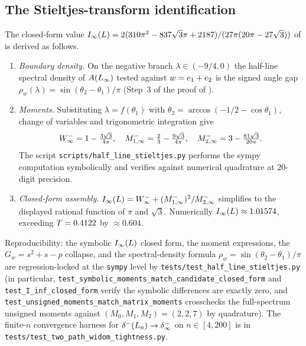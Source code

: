 \subsection{The Stieltjes-transform identification}\label{app:repro:stieltjes}

The closed-form value
$\Iinf{L} = 2(310\pi^{2} - 837\sqrt{3}\pi + 2187)/(27\pi(20\pi - 27\sqrt{3}))$
of  is derived as follows.

\begin{enumerate}
\item \emph{Boundary density.} On the negative branch
$\lambda \in (-9/4, 0)$ the half-line spectral density of $\Adj(L_{\infty})$
tested against $\earw = e_{1} + e_{2}$ is the signed angle gap
$\rho_{w}(\lambda) = \sin(\theta_{2} - \theta_{1})/\pi$ (Step~3 of the
proof of ).

\item \emph{Moments.} Substituting $\lambda = f(\theta_{1})$ with
$\theta_{2} = \arccos(-1/2 - \cos\theta_{1})$, change of variables and
trigonometric integration give
\[
\Wm_{\infty} = 1 - \tfrac{3\sqrt{3}}{4\pi},
\quad
\Monem[1, \infty] = \tfrac{2}{3} - \tfrac{9\sqrt{3}}{4\pi},
\quad
\Mtwom[2, \infty] = 3 - \tfrac{81\sqrt{3}}{20\pi}.
\]
The script \texttt{scripts/half\_line\_stieltjes.py} performs the
sympy computation symbolically and verifies against numerical
quadrature at $20$-digit precision.

\item \emph{Closed-form assembly.}
$\Iinf{L} = \Wm_{\infty} + (\Monem[1, \infty])^{2}/\Mtwom[2, \infty]$
simplifies to the displayed rational function of $\pi$ and $\sqrt{3}$.
Numerically $\Iinf{L} \approx 1.01574$, exceeding $\threshold = 0.4122$
by $\approx 0.604$.
\end{enumerate}
Reproducibility: the symbolic
$\Iinf{L}$ closed form, the moment expressions, the $G_{w} = s^{2} + s
- p$ collapse, and the spectral-density formula
$\rho_{w} = \sin(\theta_{2} - \theta_{1})/\pi$ are regression-locked at
the \texttt{sympy} level by
\texttt{tests/test\_half\_line\_stieltjes.py} (in particular,
\texttt{test\_symbolic\_moments\_match\_candidate\_closed\_form} and
\texttt{test\_I\_inf\_closed\_form} verify the symbolic differences are
exactly zero, and \texttt{test\_unsigned\_moments\_match\_matrix\_moments}
crosschecks the full-spectrum unsigned moments against
$(M_{0}, M_{1}, M_{2}) = (2, 2, 7)$ by quadrature). The finite-$n$
convergence harness for $\dminus(\Ln) \to \dminus_{\infty}$ on
$n \in [4, 200]$ is in
\texttt{tests/test\_two\_path\_widom\_tightness.py}.

